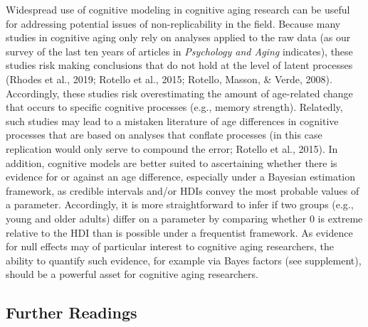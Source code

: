 \documentclass[
  english,
  ,man,floatsintext]{apa6}
\begin{document}
Widespread use of cognitive modeling in cognitive aging research can be useful for addressing potential issues of non-replicability in the field. Because many studies in cognitive aging only rely on analyses applied to the raw data (as our survey of the last ten years of articles in \emph{Psychology and Aging} indicates), these studies risk making conclusions that do not hold at the level of latent processes (Rhodes et al., 2019; Rotello et al., 2015; Rotello, Masson, \& Verde, 2008). Accordingly, these studies risk overestimating the amount of age-related change that occurs to specific cognitive processes (e.g., memory strength). Relatedly, such studies may lead to a mistaken literature of age differences in cognitive processes that are based on analyses that conflate processes (in this case replication would only serve to compound the error; Rotello et al., 2015). In addition, cognitive models are better suited to ascertaining whether there is evidence for or against an age difference, especially under a Bayesian estimation framework, as credible intervals and/or HDIs convey the most probable values of a parameter. Accordingly, it is more straightforward to infer if two groups (e.g., young and older adults) differ on a parameter by comparing whether 0 is extreme relative to the HDI than is possible under a frequentist framework. As evidence for null effects may of particular interest to cognitive aging researchers, the ability to quantify such evidence, for example via Bayes factors (see supplement), should be a powerful asset for cognitive aging researchers.

\hypertarget{further-readings}{%
\subsection{Further Readings}\label{further-readings}}
\end{document}
